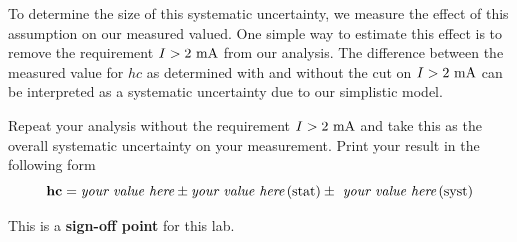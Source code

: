 To determine the size of this systematic uncertainty, we measure the
effect of this assumption on our measured valued.  One simple way to
estimate this effect is to remove the requirement $I>2~\rm mA$ from
our analysis.  The difference between the measured value for $hc$ as
determined with and without the cut on $I>2~\rm mA$ can be interpreted
as a systematic uncertainty due to our simplistic model.

\begin{print} Repeat your analysis without the requirement $I > 2~\rm mA$ and take
this as the overall systematic uncertainty on your measurement. Print your result in the following form 
\begin{displaymath}
 \textbf{hc}= \textit{your value here} \pm \textit{your value here} \,  ({\rm stat}) \pm\textit{ your value here} \, ({\rm syst})
\end{displaymath}
\end{print}

\noindent
This is a \textbf{sign-off point} for this lab. 












